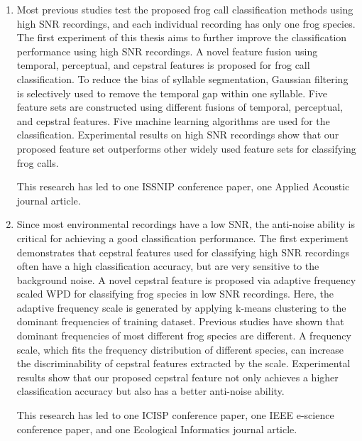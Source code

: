\begin{enumerate}

\item Most previous studies test the proposed frog call classification methods using high SNR recordings, and each individual recording has only one frog species. The first experiment of this thesis aims to further improve the classification performance using high SNR recordings. A novel feature fusion using temporal, perceptual, and cepstral features is proposed for frog call classification. To reduce the bias of syllable segmentation, Gaussian filtering is selectively used to remove the temporal gap within one syllable. Five feature sets are constructed using different fusions of temporal, perceptual, and cepstral features. Five machine learning algorithms are used for the classification. Experimental results on high SNR recordings show that our proposed feature set outperforms other widely used feature sets for classifying frog calls. 

This research has led to one ISSNIP conference paper, one Applied Acoustic  journal article.

\item Since most environmental recordings have a low SNR, the anti-noise ability is critical for achieving a good classification performance. The first experiment demonstrates that cepstral features used for classifying high SNR recordings often have a high classification accuracy, but are very sensitive to the background noise.
A novel cepstral feature is proposed via adaptive frequency scaled WPD for classifying frog species in low SNR recordings. Here, the adaptive frequency scale is generated by applying k-means clustering to the dominant frequencies of training dataset. Previous studies have shown that dominant frequencies of most different frog species are different. A frequency scale, which fits the frequency distribution of different species, can increase the discriminability of cepstral features extracted by the scale. Experimental results show that our proposed cepstral feature not only achieves a higher classification accuracy but also has a better anti-noise ability.

This research has led to one ICISP conference paper, one IEEE e-science conference paper, and one Ecological Informatics journal article.


\end{enumerate}
